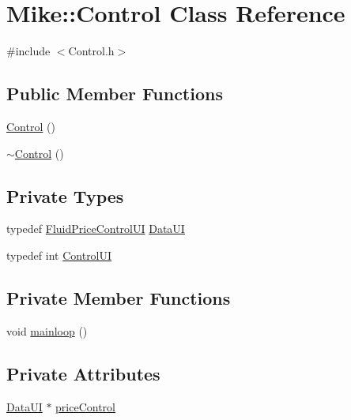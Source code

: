 \hypertarget{class_mike_1_1_control}{}\section{Mike\+:\+:Control Class Reference}
\label{class_mike_1_1_control}


{\ttfamily \#include $<$Control.\+h$>$}

\subsection*{Public Member Functions}
\begin{DoxyCompactItemize}
\item 
\hyperlink{class_mike_1_1_control_ac9a2e3b56773b1eadab7297327a9fbcc}{Control} ()
\item 
\hyperlink{class_mike_1_1_control_aa3395e0509ab5b980732ab0e3a29ce4d}{$\sim$\+Control} ()
\end{DoxyCompactItemize}
\subsection*{Private Types}
\begin{DoxyCompactItemize}
\item 
typedef \hyperlink{class_fluid_price_control_u_i}{Fluid\+Price\+Control\+UI} \hyperlink{class_mike_1_1_control_addbe39ef40982f0a4002b6f74091a799}{Data\+UI}
\item 
typedef int \hyperlink{class_mike_1_1_control_a313ca882c409ba9bed4837acf6d17a72}{Control\+UI}
\end{DoxyCompactItemize}
\subsection*{Private Member Functions}
\begin{DoxyCompactItemize}
\item 
void \hyperlink{class_mike_1_1_control_a3440083f03f7da3d4490fa44bc13d62b}{mainloop} ()
\end{DoxyCompactItemize}
\subsection*{Private Attributes}
\begin{DoxyCompactItemize}
\item 
\hyperlink{class_mike_1_1_control_addbe39ef40982f0a4002b6f74091a799}{Data\+UI} $\ast$ \hyperlink{class_mike_1_1_control_a61d38447360ba0baa9ac8a3607de0c5b}{price\+Control}
\end{DoxyCompactItemize}


